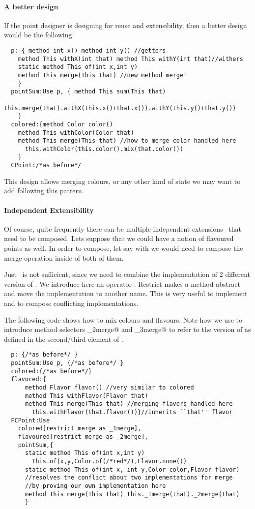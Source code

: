 \paragraph{A better design}
If the point designer is designing for reuse and extensibility, then 
a better design would be the following:  
\saveSpace\begin{lstlisting}
  p: { method int x() method int y() //getters
    method This withX(int that) method This withY(int that)//withers
    static method This of(int x,int y)
    method This merge(This that) //new method merge!
    }
  pointSum:Use p, { method This sum(This that)
      this.merge(that).withX(this.x()+that.x()).withY(this.y()+that.y())
    }
  colored:{method Color color()
    method This withColor(Color that)
    method This merge(This that) //how to merge color handled here
      this.withColor(this.color().mix(that.color())
    }
  CPoint:/*as before*/
\end{lstlisting}  \saveSpace
  \noindent This design allows merging colours, or any other kind of state we may want to add
  following this pattern.%

\paragraph{Independent Extensibility}
  Of course, quite frequently there can be multiple independent
  extensions~\cite{Zenger-Odersky2005} that need to be composed. Lets suppose that 
  we could have a notion of flavoured points as well.   
  In order to compose, let say \Q@colored@ with \Q@flavored@ we would
  need to compose the merge operation inside of both of them.

Just \use\ is not sufficient, since we need to combine the implementation of 2 different version of \Q@merge@.
We introduce here an operator \Q@restrict@.
Restrict makes a method abstract and
move the implementation to another name. This is very useful to implement \Q@super@
 and to compose conflicting implementations.

The following code shows how to mix colours and flavours. 
Note how we use \Q@restrict@ to introduce method selectors \Q@_2merge@ and \Q@_3merge@
to refer to the version of \Q@merge@ as defined in the second/third element of \use.
\saveSpace\begin{lstlisting}
  p: {/*as before*/ }
  pointSum:Use p, {/*as before*/ }
  colored:{/*as before*/}
  flavored:{
      method Flavor flavor() //very similar to colored
      method This withFlavor(Flavor that)
      method This merge(This that) //merging flavors handled here
        this.withFlavor(that.flavor())}//inherits ``that'' flavor
  FCPoint:Use
    colored[restrict merge as _1merge],
    flavoured[restrict merge as _2merge],
    pointSum,{
      static method This of(int x,int y)
        This.of(x,y,Color.of(/*red*/),Flavor.none())
      static method This of(int x, int y,Color color,Flavor flavor)
      //resolves the conflict about two implementations for merge
      //by proving our own implementation here
      method This merge(This that) this._1merge(that)._2merge(that)
      }
\end{lstlisting}  \saveSpace\saveSpace

